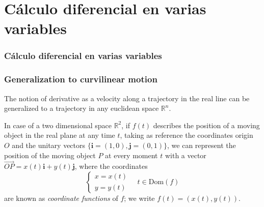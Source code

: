 \section{Cálculo diferencial en varias variables}
\begin{frame}
\frametitle{Cálculo diferencial en varias variables}
\tableofcontents[sectionstyle=show/hide,hideothersubsections]
\end{frame}


\begin{frame}
\frametitle{Generalization to curvilinear motion}
The notion of derivative as a velocity along a trajectory in the real line can be generalized to a trajectory in any euclidean space $\mathbb{R}^n$.

In case of a two dimensional space $\mathbb{R}^2$, if $f(t)$ describes the position of a moving object in the real plane at any time $t$, taking as reference the coordinates origin $O$ and the unitary vectors $\{\mathbf{i}=(1,0),\mathbf{j}=(0,1)\}$, we can represent the position of the moving object $P$ at every moment $t$ with a vector $\vec{OP}=x(t)\mathbf{i}+y(t)\mathbf{j}$, where the coordinates 
\[
\begin{cases}
x=x(t)\\
y=y(t)
\end{cases}
\quad
t\in \mbox{Dom}(f)
\]
are known as \emph{coordinate functions} of $f$; we write $f(t)=(x(t),y(t))$.

\begin{center}
\end{center}
\end{frame}


